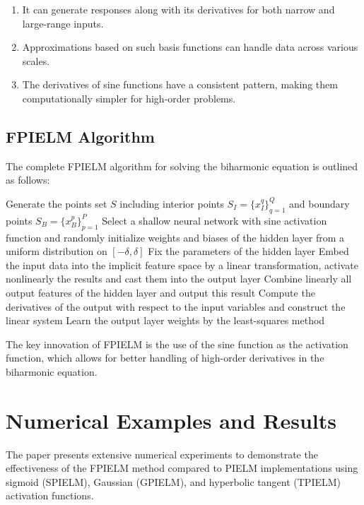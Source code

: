 \documentclass[11pt]{article}
\begin{document}
\begin{enumerate}
    \item It can generate responses along with its derivatives for both narrow and large-range inputs.
    \item Approximations based on such basis functions can handle data across various scales.
    \item The derivatives of sine functions have a consistent pattern, making them computationally simpler for high-order problems.
\end{enumerate}

\subsection{FPIELM Algorithm}

The complete FPIELM algorithm for solving the biharmonic equation is outlined as follows:

\begin{algorithm}[H]
\caption{FPIELM algorithm for solving biharmonic equation}
\begin{algorithmic}[1]
\STATE Generate the points set $S$ including interior points $S_I = \{x_I^q\}_{q=1}^Q$ and boundary points $S_B = \{x_B^p\}_{p=1}^P$
\STATE Select a shallow neural network with sine activation function and randomly initialize weights and biases of the hidden layer from a uniform distribution on $[-\delta, \delta]$
\STATE Fix the parameters of the hidden layer
\STATE Embed the input data into the implicit feature space by a linear transformation, activate nonlinearly the results and cast them into the output layer
\STATE Combine linearly all output features of the hidden layer and output this result
\STATE Compute the derivatives of the output with respect to the input variables and construct the linear system
\STATE Learn the output layer weights by the least-squares method
\end{algorithmic}
\end{algorithm}

The key innovation of FPIELM is the use of the sine function as the activation function, which allows for better handling of high-order derivatives in the biharmonic equation.

\section{Numerical Examples and Results}

The paper presents extensive numerical experiments to demonstrate the effectiveness of the FPIELM method compared to PIELM implementations using sigmoid (SPIELM), Gaussian (GPIELM), and hyperbolic tangent (TPIELM) activation functions.
\end{document}
